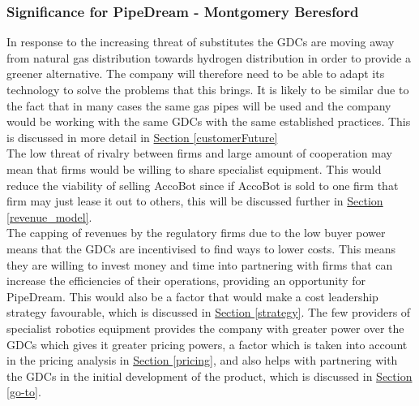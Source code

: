 \documentclass[11pt]{article}		%
\newcommand{\supercite}[1]{\textsuperscript{\cite{#1}}}		%
\newcommand{\sectref}[1]{\hyperref[#1]{Section \ref*{#1}}}     %
\begin{document}
           \subsubsection{Significance for PipeDream - Montgomery Beresford} \label{pricingpower}
           
                In response to the increasing threat of substitutes the GDCs are moving away from natural gas distribution towards hydrogen distribution in order to provide a greener alternative. The company will therefore need to be able to adapt its technology to solve the problems that this brings. It is likely to be similar due to the fact that in many cases the same gas pipes will be used and the company would be working with the same GDCs with the same established practices. This is discussed in more detail in \sectref{customerFuture}
                \\ 
                \hspace*{2ex}The low threat of rivalry between firms and large amount of cooperation may mean that firms would be willing to share specialist equipment. This would  reduce the viability of selling AccoBot since if AccoBot is sold to one firm that firm may just lease it out to others, this will be discussed further in \sectref{revenue_model}. 
                \\
                \hspace*{2ex}The capping of revenues by the regulatory firms due to the low buyer power means that the GDCs are incentivised to find ways to lower costs. This means they are willing to invest money and time into partnering with firms that can increase the efficiencies of their operations, providing an opportunity for PipeDream. This would also be a factor that would make a cost leadership strategy favourable, which is discussed in \sectref{strategy}.
                The few providers of specialist robotics equipment provides the company with greater power over the GDCs which gives it greater pricing powers, a factor which is taken into account in the pricing analysis in \sectref{pricing}, and also helps with partnering with the GDCs in the initial development of the product, which is discussed in \sectref{go-to}. 
       
                
\end{document}
